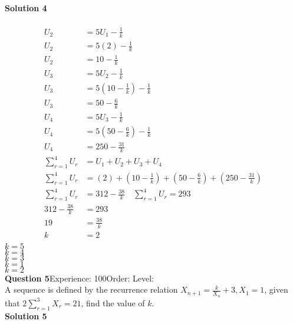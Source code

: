 \documentclass{article}
\begin{document}
\noindent\textbf{Solution 4}\\[2pt]
\\[-10pt]\begin{align*}
U_2&=5U_1-\displaystyle\frac{1}{k}\\[2pt]
U_2&=5(2)-\displaystyle\frac{1}{k}\\[2pt]
U_2&=10-\displaystyle\frac{1}{k}\\[12pt]
U_3&=5U_2-\displaystyle\frac{1}{k}\\[2pt]
U_3&=5\left(10-\displaystyle\frac{1}{k}\right)-\displaystyle\frac{1}{k}\\[2pt]
U_3&=50-\displaystyle\frac{6}{k}\\[12pt]
U_4&=5U_3-\displaystyle\frac{1}{k}\\[2pt]
U_4&=5\left(50-\displaystyle\frac{6}{k}\right)-\displaystyle\frac{1}{k}\\[2pt]
U_4&=250-\displaystyle\frac{31}{k}\\[12pt]
\displaystyle\sum_{r=1}^{4} U_r&=U_1+U_2+U_3+U_4\\[2pt]
\displaystyle\sum_{r=1}^{4} U_r&=(2)+\left(10-\displaystyle\frac{1}{k}\right)+\left(50-\displaystyle\frac{6}{k}\right)+\left(250-\displaystyle\frac{31}{k}\right)\\[2pt]
\displaystyle\sum_{r=1}^{4} U_r&=312-\displaystyle\frac{38}{k}\quad\displaystyle\sum_{r=1}^{4} U_r=293\\[2pt]
312-\displaystyle\frac{38}{k}&=293\\[2pt]
19&=\displaystyle\frac{38}{k}\\[2pt]
k&=2\\[-30pt]
\end{align*}
$k=5$\\
$k=4$\\
$k=3$\\
$k=1$\\
$k=2$\\
\noindent\textbf{Question 5}\hspace{20pt}Experience: 100\hspace{20pt}Order: \hspace{20pt}Level: \\[2pt]
A sequence is defined by the recurrence relation $X_{n+1}=\displaystyle\frac{k}{X_n}+3, X_1=1$, given that $2\displaystyle\sum_{r=1}^{3} X_r=21$, find the value of $k$.\\[4pt]
\noindent\textbf{Solution 5}\\[2pt]
\end{document}
